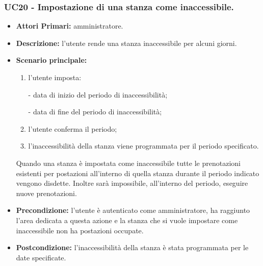 \subsubsection{UC20 - Impostazione di una stanza come inaccessibile.}
\begin{itemize}
	\item\textbf{Attori Primari:}
	amministratore.
	\item\textbf{Descrizione:}
	l'utente rende una stanza inaccessibile per alcuni giorni.
	\item\textbf{Scenario principale:} 
	\begin{enumerate}
		\item l'utente imposta: %
			
				- data di inizio del periodo di inaccessibilità;
				
				- data di fine del periodo di inaccessibilità;
			
		\item l'utente conferma il periodo;
		\item l'inaccessibilità della stanza viene programmata per il periodo specificato.
	\end{enumerate}
	Quando una stanza è impostata come inaccessibile tutte le prenotazioni esistenti per postazioni all'interno di quella stanza durante il periodo indicato vengono disdette. Inoltre sarà impossibile, all'interno del periodo, eseguire nuove prenotazioni.
	\item\textbf{Precondizione:} 
	l'utente è autenticato come amministratore, ha raggiunto l'area dedicata a questa azione e la stanza che si vuole impostare come inaccessibile non ha postazioni occupate.
	\item\textbf{Postcondizione:}
	l'inaccessibilità della stanza è stata programmata per le date specificate.
\end{itemize}

